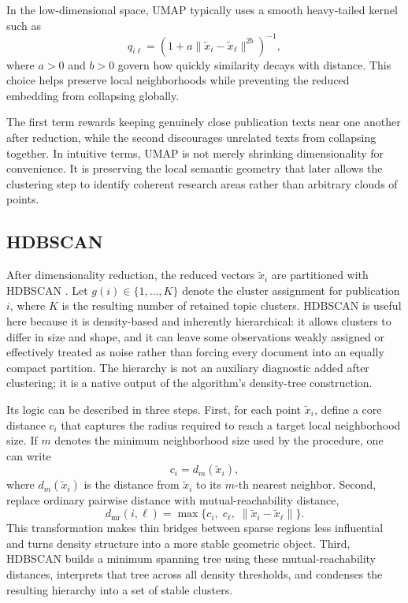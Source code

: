 \documentclass[11pt]{article}
\begin{document}
In the low-dimensional space, UMAP typically uses a smooth heavy-tailed kernel such as
\[
q_{i\ell}
=
\left(1+a\|\tilde{x}_i-\tilde{x}_\ell\|^{2b}\right)^{-1},
\]
where $a>0$ and $b>0$ govern how quickly similarity decays with distance. This choice helps preserve local neighborhoods while preventing the reduced embedding from collapsing globally.

The first term rewards keeping genuinely close publication texts near one another after reduction, while the second discourages unrelated texts from collapsing together. In intuitive terms, UMAP is not merely shrinking dimensionality for convenience. It is preserving the local semantic geometry that later allows the clustering step to identify coherent research areas rather than arbitrary clouds of points.

\subsection{HDBSCAN}

After dimensionality reduction, the reduced vectors $\tilde{x}_i$ are partitioned with HDBSCAN \citep{campello2013hdbscan,mcinnes2017hdbscan}. Let $g(i) \in \{1,\dots,K\}$ denote the cluster assignment for publication $i$, where $K$ is the resulting number of retained topic clusters. HDBSCAN is useful here because it is density-based and inherently hierarchical: it allows clusters to differ in size and shape, and it can leave some observations weakly assigned or effectively treated as noise rather than forcing every document into an equally compact partition. The hierarchy is not an auxiliary diagnostic added after clustering; it is a native output of the algorithm's density-tree construction.

Its logic can be described in three steps. First, for each point $\tilde{x}_i$, define a core distance $c_i$ that captures the radius required to reach a target local neighborhood size. If $m$ denotes the minimum neighborhood size used by the procedure, one can write
\[
c_i = d_m(\tilde{x}_i),
\]
where $d_m(\tilde{x}_i)$ is the distance from $\tilde{x}_i$ to its $m$-th nearest neighbor. Second, replace ordinary pairwise distance with mutual-reachability distance,
\[
d_{\mathrm{mr}}(i,\ell)
=
\max\{c_i,\; c_\ell,\; \|\tilde{x}_i-\tilde{x}_\ell\|\}.
\]
This transformation makes thin bridges between sparse regions less influential and turns density structure into a more stable geometric object. Third, HDBSCAN builds a minimum spanning tree using these mutual-reachability distances, interprets that tree across all density thresholds, and condenses the resulting hierarchy into a set of stable clusters.
\end{document}
